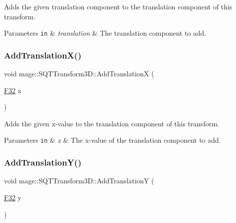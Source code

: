 Adds the given translation component to the translation component of this transform.


\begin{DoxyParams}[1]{Parameters}
\mbox{\tt in}  & {\em translation} & The translation component to add. \\
\hline
\end{DoxyParams}
\mbox{\label{classmage_1_1_s_q_t_transform3_d_a0a9ade987f55073e896eb4552fdca526}} 
\subsubsection{\texorpdfstring{Add\+Translation\+X()}{AddTranslationX()}}
{\footnotesize\ttfamily void mage\+::\+S\+Q\+T\+Transform3\+D\+::\+Add\+TranslationX (\begin{DoxyParamCaption}\item[{\mbox{\hyperlink{namespacemage_aa97e833b45f06d60a0a9c4fc22ae02c0}{F32}}}]{x }\end{DoxyParamCaption})\hspace{0.3cm}{\ttfamily [noexcept]}}

Adds the given x-\/value to the translation component of this transform.


\begin{DoxyParams}[1]{Parameters}
\mbox{\tt in}  & {\em x} & The x-\/value of the translation component to add. \\
\hline
\end{DoxyParams}
\mbox{\label{classmage_1_1_s_q_t_transform3_d_aad247d922656dc6160a097598fe55aba}} 
\subsubsection{\texorpdfstring{Add\+Translation\+Y()}{AddTranslationY()}}
{\footnotesize\ttfamily void mage\+::\+S\+Q\+T\+Transform3\+D\+::\+Add\+TranslationY (\begin{DoxyParamCaption}\item[{\mbox{\hyperlink{namespacemage_aa97e833b45f06d60a0a9c4fc22ae02c0}{F32}}}]{y }\end{DoxyParamCaption})\hspace{0.3cm}{\ttfamily [noexcept]}}

